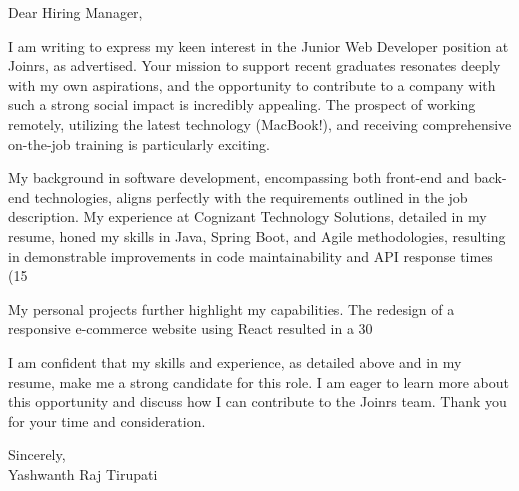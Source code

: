 \documentclass[letterpaper,11pt]{article}
\begin{document}
\begin{flushleft}
Dear Hiring Manager,

\vspace{12pt}

I am writing to express my keen interest in the Junior Web Developer position at Joinrs, as advertised.  Your mission to support recent graduates resonates deeply with my own aspirations, and the opportunity to contribute to a company with such a strong social impact is incredibly appealing.  The prospect of working remotely, utilizing the latest technology (MacBook!), and receiving comprehensive on-the-job training is particularly exciting.

\vspace{12pt}

My background in software development, encompassing both front-end and back-end technologies, aligns perfectly with the requirements outlined in the job description.  My experience at Cognizant Technology Solutions, detailed in my resume, honed my skills in Java, Spring Boot, and Agile methodologies, resulting in demonstrable improvements in code maintainability and API response times (15%

\vspace{12pt}

My personal projects further highlight my capabilities. The redesign of a responsive e-commerce website using React resulted in a 30%

\vspace{12pt}

I am confident that my skills and experience, as detailed above and in my resume, make me a strong candidate for this role. I am eager to learn more about this opportunity and discuss how I can contribute to the Joinrs team. Thank you for your time and consideration.


\vspace{20pt}

Sincerely, \\
Yashwanth Raj Tirupati

\end{flushleft}
\end{document}
